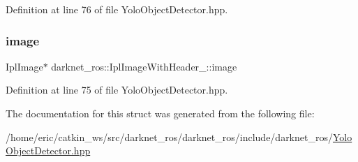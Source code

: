 Definition at line 76 of file Yolo\+Object\+Detector.\+hpp.

\mbox{\label{structdarknet__ros_1_1IplImageWithHeader___acaccc5a13d1573a180d4a95dbf0d42dc}} 
\subsubsection{\texorpdfstring{image}{image}}
{\footnotesize\ttfamily Ipl\+Image$\ast$ darknet\+\_\+ros\+::\+Ipl\+Image\+With\+Header\+\_\+\+::image}



Definition at line 75 of file Yolo\+Object\+Detector.\+hpp.



The documentation for this struct was generated from the following file\+:\begin{DoxyCompactItemize}
\item 
/home/eric/catkin\+\_\+ws/src/darknet\+\_\+ros/darknet\+\_\+ros/include/darknet\+\_\+ros/\mbox{\hyperlink{YoloObjectDetector_8hpp}{Yolo\+Object\+Detector.\+hpp}}\end{DoxyCompactItemize}
